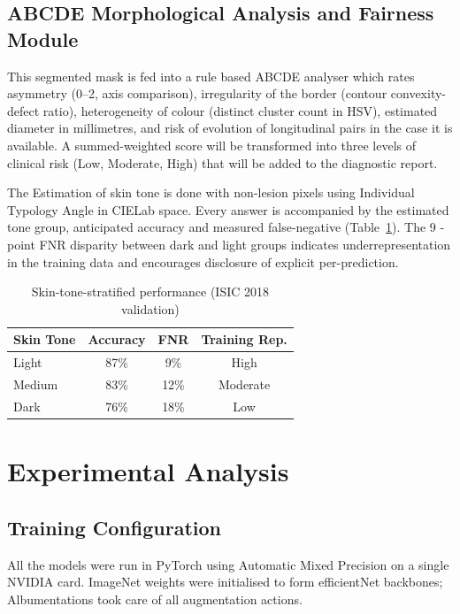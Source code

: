 \documentclass[conference]{IEEEtran}
\begin{document}
\subsection{ABCDE Morphological Analysis and Fairness Module}

This segmented mask is fed into a rule based ABCDE analyser which rates asymmetry (0--2, axis comparison), irregularity of the border (contour convexity-defect ratio), heterogeneity of colour (distinct cluster count in HSV), estimated diameter in millimetres, and risk of evolution of longitudinal pairs in the case it is available. A summed-weighted score will be transformed into three levels of clinical risk (Low, Moderate, High) that will be added to the diagnostic report.

The Estimation of skin tone is done with non-lesion pixels using Individual Typology Angle in CIELab space. Every answer is accompanied by the estimated tone group, anticipated accuracy and measured false-negative (Table~\ref{tab:fairness}). The 9 -point FNR disparity between dark and light groups indicates underrepresentation in the training data and encourages disclosure of explicit per-prediction.


\begin{table}[h]
\centering
\caption{Skin-tone-stratified performance (ISIC 2018 validation)}
\label{tab:fairness}
\begin{tabular}{lccc}
\hline
Skin Tone & Accuracy & FNR & Training Rep. \\
\hline
Light  & 87\% &  9\% & High \\
Medium & 83\% & 12\% & Moderate \\
Dark   & 76\% & 18\% & Low \\
\hline
\end{tabular}
\end{table}

\section{Experimental Analysis}
\label{sec:experiments}

\subsection{Training Configuration}

All the models were run in PyTorch using Automatic Mixed Precision on a single NVIDIA card. ImageNet weights were initialised to form efficientNet backbones; Albumentations took care of all augmentation actions.
\end{document}
